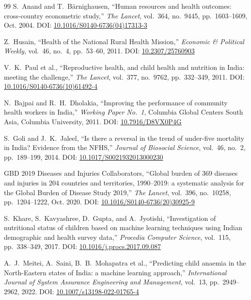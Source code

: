 \documentclass[conference]{IEEEtran}
\begin{document}
\begin{thebibliography}{99}
S.\ Anand and T.\ B\"{a}rnighausen,
``Human resources and health outcomes: cross-country econometric study,''
\textit{The Lancet}, vol.~364, no.~9445, pp.~1603--1609, Oct. 2004.
DOI: \href{https://doi.org/10.1016/S0140-6736(04)17313-3}{10.1016/S0140-6736(04)17313-3}

Z.\ Husain,
``Health of the National Rural Health Mission,''
\textit{Economic \& Political Weekly}, vol.~46, no.~4, pp.~53--60, 2011.
DOI: \href{https://doi.org/10.2307/25760903}{10.2307/25760903}

V.~K.\ Paul et al.,
``Reproductive health, and child health and nutrition in India: meeting the challenge,''
\textit{The Lancet}, vol.~377, no.~9762, pp.~332--349, 2011.
DOI: \href{https://doi.org/10.1016/S0140-6736(10)61492-4}{10.1016/S0140-6736(10)61492-4}

N.\ Bajpai and R.~H.\ Dholakia,
``Improving the performance of community health workers in India,''
\textit{Working Paper No.\ 1}, Columbia Global Centers South Asia,
Columbia University, 2011.
DOI: \href{https://doi.org/10.7916/D8VX0P4G}{10.7916/D8VX0P4G}

S.\ Goli and J.~K.\ Jaleel,
``Is there a reversal in the trend of under-five mortality in India? Evidence from the NFHS,''
\textit{Journal of Biosocial Science}, vol.~46, no.~2, pp.~189--199, 2014.
DOI: \href{https://doi.org/10.1017/S0021932013000230}{10.1017/S0021932013000230}

GBD 2019 Diseases and Injuries Collaborators,
``Global burden of 369 diseases and injuries in 204 countries and territories, 1990--2019: a systematic analysis for the Global Burden of Disease Study 2019,''
\textit{The Lancet}, vol.~396, no.~10258, pp.~1204--1222, Oct. 2020.
DOI: \href{https://doi.org/10.1016/S0140-6736(20)30925-9}{10.1016/S0140-6736(20)30925-9}

S.\ Khare, S.\ Kavyashree, D.\ Gupta, and A.\ Jyotishi,
``Investigation of nutritional status of children based on machine learning techniques using Indian demographic and health survey data,''
\textit{Procedia Computer Science}, vol.~115, pp.~338--349, 2017.
DOI: \href{https://doi.org/10.1016/j.procs.2017.09.087}{10.1016/j.procs.2017.09.087}

A.~J.\ Meitei, A.\ Saini, B.~B.\ Mohapatra et al.,
``Predicting child anaemia in the North-Eastern states of India: a machine learning approach,''
\textit{International Journal of System Assurance Engineering and Management},
vol.~13, pp.~2949--2962, 2022.
DOI: \href{https://doi.org/10.1007/s13198-022-01765-4}{10.1007/s13198-022-01765-4}


\end{thebibliography}
\end{document}
